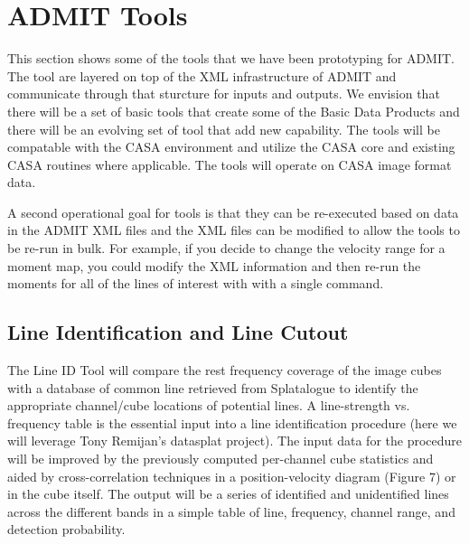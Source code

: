 \section{ADMIT Tools}

This section shows some of the tools that we have
been prototyping for ADMIT. The tool are layered on top
of the XML infrastructure of ADMIT and  communicate through
that sturcture for inputs and outputs. We envision
that there will be a set of basic tools that create some
of the Basic Data Products and there will be an evolving
set of tool that add new capability. The tools will be
compatable with the CASA environment and utilize the CASA
core and existing CASA routines where applicable. The tools
will operate on CASA image format data.

A second operational goal for tools is that they can
be re-executed based on data in the ADMIT XML files and the
XML files can be modified to allow the tools to be re-run
in bulk. For example, if you decide to change the velocity
range for a moment map, you could modify the XML information
and then re-run the moments for all of the lines of interest with
with a single command.

\subsection{Line Identification and Line Cutout}

The Line ID Tool will compare the rest frequency coverage of the 
image cubes with a database of common line retrieved from Splatalogue to 
identify the appropriate channel/cube locations of potential lines.  
A line-strength vs. frequency table is the essential input into a line 
identification procedure (here we will leverage Tony Remijan’s datasplat project). 
The input data for the procedure will be improved by the previously computed 
per-channel cube statistics and aided by cross-correlation techniques in a 
position-velocity diagram (Figure 7) or in the cube itself. The output will 
be a series of identified and unidentified lines across the different bands 
in a simple table of line, frequency, channel range, and detection probability.

